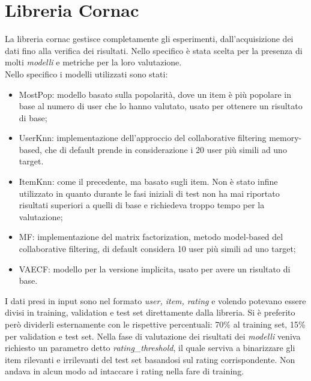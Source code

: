 \section{Libreria Cornac}
La libreria cornac gestisce completamente gli esperimenti, dall'acquisizione dei dati fino alla verifica dei risultati.
Nello specifico è stata scelta per la presenza di molti \textit{modelli} e metriche per la loro valutazione.\\
Nello specifico i modelli utilizzati sono stati:
\begin{itemize}
    \item MostPop: modello basato sulla popolarità, dove un item è più popolare in base al numero di user che lo hanno valutato, usato per ottenere un risultato di base;
    \item UserKnn: implementazione dell'approccio del collaborative filtering memory-based, che di default prende in considerazione i 20 user più simili ad uno target.
    \item ItemKnn: come il precedente, ma basato sugli item. Non è stato infine utilizzato in quanto durante le fasi iniziali di test non ha mai riportato risultati superiori a quelli di base e richiedeva troppo tempo per la valutazione;
    \item MF: implementazione del matrix factorization, metodo model-based del collaborative filtering, di default considera 10 user più simili ad uno target;
    \item VAECF: modello per la versione implicita, usato per avere un risultato di base.
\end{itemize}
I dati presi in input sono nel formato \textit{user, item, rating} e volendo potevano essere divisi in training, validation e test set direttamente dalla libreria.
Si è preferito però dividerli esternamente con le rispettive percentuali: 70\% al training set, 15\% per validation e test set.
Nella fase di valutazione dei risultati dei \textit{modelli} veniva richiesto un parametro detto \textit{rating\_threshold}, il quale serviva a binarizzare gli item rilevanti e irrilevanti del test set basandosi sul rating corrispondente. Non andava in alcun modo ad intaccare i rating nella fare di training.
 
